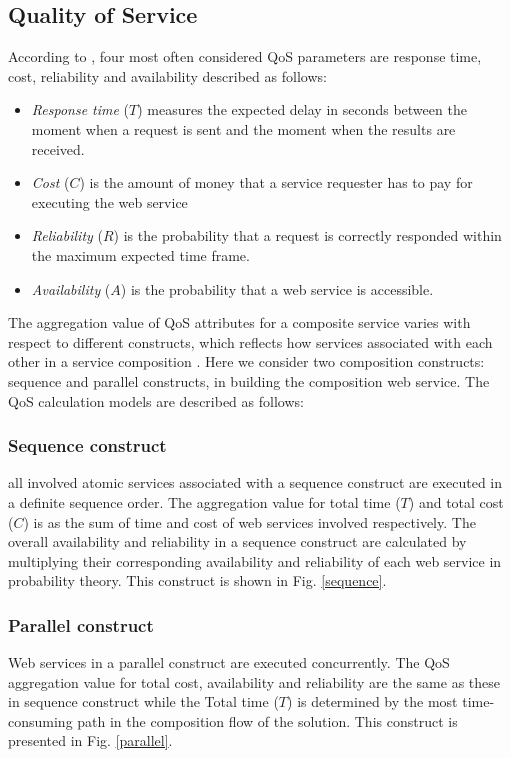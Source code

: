 \documentclass{llncs}
\begin{document}
\subsection{Quality of Service}\label{Quality of Service and Composition Constructs}
According to \cite{zeng2003quality}, four most often considered QoS parameters are response time, cost, reliability and availability described as follows:
\begin{itemize}
\item \textit{Response time} ($T$) measures the expected delay in seconds between the moment when a request is sent and the moment when the results are received.
\item \textit{Cost} ($C$) is the amount of money that a service requester has to pay for executing the web service
\item \textit{Reliability} ($R$) is the probability that a request is correctly responded within the maximum expected time frame.
\item \textit{Availability} ($A$) is the probability that a web service is accessible.
\end{itemize}
The aggregation value of QoS attributes for a composite service varies with respect to different constructs, which reflects how services associated with each other in a service composition \cite{zeng2003quality}. Here we consider two composition constructs: sequence and parallel constructs, in building the composition web service. The QoS calculation models are described as follows:
\subsubsection{Sequence construct}
all involved atomic services associated with a sequence construct are executed in a definite sequence order. The aggregation value for total time ($T$) and total cost ($C$) is as the sum of time and cost of web services involved respectively. The overall availability and reliability in a sequence construct are calculated by multiplying their corresponding availability and reliability of each web service in probability theory. This construct is shown in Fig. \ref{sequence}.
\subsubsection{Parallel construct}
Web services in a parallel construct are executed concurrently. The QoS aggregation value for total cost, availability and reliability are the same as these in sequence construct while the Total time ($T$) is determined by the most time-consuming path in the composition flow of the solution. This construct is presented in Fig. \ref{parallel}.
\end{document}
